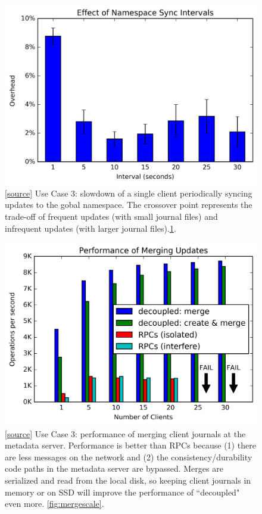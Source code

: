 \begin{figure}[tb] \centering
\includegraphics[width=1.0\linewidth]{graphs/slowdown-sync.png} \caption{
[\href{https://...}{source}] Use Case 3: slowdown of a single client periodically syncing
updates to the gobal namespace. The crossover point represents the trade-off of
frequent updates (with small journal files) and infrequent updates (with larger journal
files).\ref{fig:slowdown-sync}.  \label{fig:slowdown-sync}}
\end{figure}

\begin{figure}[tb] \centering
\includegraphics[width=1.0\linewidth]{graphs/mergescale.png} \caption{
[\href{https://...}{source}] Use Case 3: performance of merging client journals
at the metadata server. Performance is better than RPCs because (1) there are
less messages on the network and (2) the consistency/durability code paths in
the metadata server are bypassed. Merges are serialized and read from the local
disk, so keeping client journals in memory or on SSD will improve the
performance of ``decoupled" even more.  \ref{fig:mergescale}.
\label{fig:mergescale-sync}}
\end{figure}

